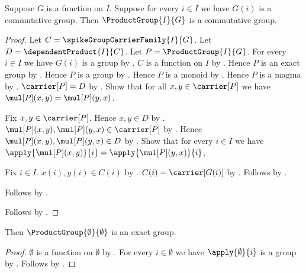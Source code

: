 \begin{proposition}\label{spike_product_group_is_commutative}
    Suppose $G$ is a function on $I$.
    Suppose for every $i\in I$ we have $G(i)$ is a commutative group.
    Then $\ProductGroup{I}{G}$ is a commutative group.
\end{proposition}
\begin{proof}
    Let $C=\spikeGroupCarrierFamily{I}{G}$.
    Let $D=\dependentProduct{I}{C}$.
    Let $P=\ProductGroup{I}{G}$.
    For every $i\in I$ we have $G(i)$ is a group by
        .
    $C$ is a function on $I$ by
        .
    Hence $P$ is an exact group by
        .
    Hence $P$ is a group by \auto.
    Hence $P$ is a monoid by .
    Hence $P$ is a magma by .
    $\carrier[P]=D$ by .
    Show that for all $x,y\in\carrier[P]$ we have
        $\mul[P](x,y)=\mul[P](y,x)$.
    \begin{subproof}
        Fix $x,y\in\carrier[P]$.
        Hence $x,y\in D$ by .
        $\mul[P](x,y),\mul[P](y,x)\in\carrier[P]$ by
            .
        Hence $\mul[P](x,y),\mul[P](y,x)\in D$ by \auto.
        Show that for every $i\in I$ we have
            $\apply{\mul[P](x,y)}{i}
                =\apply{\mul[P](y,x)}{i}$.
        \begin{subproof}
            Fix $i\in I$.
            $x(i),y(i)\in C(i)$ by
                .
            $C(i)=\carrier[G(i)]$ by
                .
            Follows by
                .
        \end{subproof}
        Follows by .
    \end{subproof}
    Follows by .
\end{proof}

\begin{proposition}\label{spike_empty_product_group_is_exact}
    Then $\ProductGroup{\emptyset}{\emptyset}$ is an exact group.
\end{proposition}
\begin{proof}
    $\emptyset$ is a function on $\emptyset$ by
        .
    For every $i\in\emptyset$ we have
        $\apply{\emptyset}{i}$ is a group by .
    Follows by .
\end{proof}

